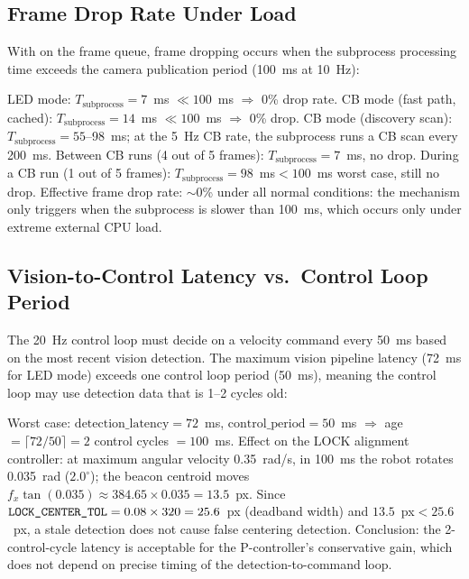 \subsection{Frame Drop Rate Under Load}

With  on the frame queue, frame dropping occurs when the subprocess processing time exceeds the camera publication period (100~ms at 10~Hz):

\begin{eqblock}
LED mode: $T_{\text{subprocess}}=7$~ms $\ll100$~ms $\Rightarrow$ 0\% drop rate. CB mode (fast path, cached): $T_{\text{subprocess}}=14$~ms $\ll100$~ms $\Rightarrow$ 0\% drop. CB mode (discovery scan): $T_{\text{subprocess}}=55$--98~ms; at the 5~Hz CB rate, the subprocess runs a CB scan every 200~ms. Between CB runs (4 out of 5 frames): $T_{\text{subprocess}}=7$~ms, no drop. During a CB run (1 out of 5 frames): $T_{\text{subprocess}}=98$~ms$<100$~ms worst case, still no drop. Effective frame drop rate: $\sim$0\% under all normal conditions: the  mechanism only triggers when the subprocess is slower than 100~ms, which occurs only under extreme external CPU load.
\end{eqblock}

\subsection{Vision-to-Control Latency vs.\ Control Loop Period}

The 20~Hz control loop must decide on a velocity command every 50~ms based on the most recent vision detection. The maximum vision pipeline latency (72~ms for LED mode) exceeds one control loop period (50~ms), meaning the control loop may use detection data that is 1--2 cycles old:

\begin{eqblock}
Worst case: $\text{detection\_latency}=72$~ms, $\text{control\_period}=50$~ms $\Rightarrow$ age $=\lceil72/50\rceil=2$ control cycles $=100$~ms. Effect on the LOCK alignment controller: at maximum angular velocity 0.35~rad/s, in 100~ms the robot rotates 0.035~rad ($2.0^\circ$); the beacon centroid moves $f_x\tan(0.035)\approx384.65\times0.035=13.5$~px. Since $\code{LOCK\_CENTER\_TOL}=0.08\times320=25.6$~px (deadband width) and $13.5$~px$<25.6$~px, a stale detection does not cause false centering detection. Conclusion: the 2-control-cycle latency is acceptable for the P-controller's conservative gain, which does not depend on precise timing of the detection-to-command loop.
\end{eqblock}

